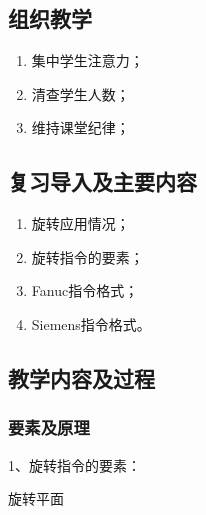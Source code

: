 \jxhj{%
	}

\makeshouye %

\subsection{组织教学}
\begin{enumerate}[\hspace{2em}1、]
	\item 集中学生注意力；
	\item 清查学生人数；
	\item 维持课堂纪律；
\end{enumerate}

\subsection{复习导入及主要内容}
\begin{enumerate}[1、]
\item 旋转应用情况；
\item 旋转指令的要素；
\item Fanuc指令格式；
\item Siemens指令格式。
\end{enumerate}

\subsection{教学内容及过程}
	
\subsubsection{要素及原理}
	1、旋转指令的要素：
	
	旋转平面
	
